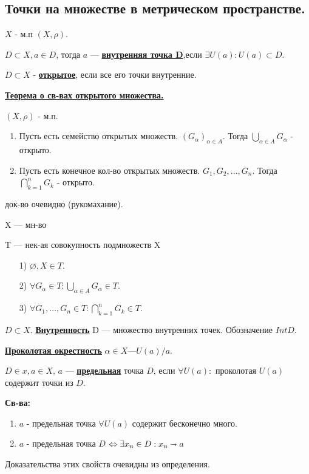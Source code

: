 \documentclass{article}
\newcommand{\deff}[1]{\underline{\textbf{#1}}}
\newcommand{\thmm}[1]{\underline{\textbf{#1}}}
\begin{document}
\subsection{Точки на множестве в метрическом пространстве.}

$X$ - м.п $(X,\rho)$.

$D \subset X, a \in D$, тогда $a$ --- \deff{внутренняя точка D},если $\exists U(a): U(a) \subset D$. 

$D \subset X $ - \deff{открытое}, если все его точки внутренние.

\thmm{Теорема о св-вах открытого множества.}

$(X,\rho)$ - м.п.

\begin{enumerate}
    \item Пусть есть семейство открытых множеств. $(G_\alpha)_{\alpha \in A}$. Тогда $\bigcup\limits_{\alpha \in A}G_\alpha$ - открыто.
    \item Пусть есть конечное кол-во открытых множеств. $G_1,G_2,\ldots, G_n$. Тогда $\bigcap\limits_{k=1}^nG_k$ - открыто.
    
\end{enumerate}

док-во очевидно (рукомахание).

X --- мн-во

T --- нек-ая совокупность подмножеств X

\begin{enumerate}
    \item[1) ] $\varnothing, X \in T$.
    \item[2) ] $\forall G_{\alpha} \in T: \bigcup\limits_{\alpha \in A}G_\alpha \in T$.
    \item[3) ] $\forall G_1,\ldots,G_n \in T: \bigcap\limits_{k=1}^n G_k \in T$.
\end{enumerate}

 $D \subset X$. \deff{Внутренность} D --- множество внутренних точек. Обозначение $Int D$.

\deff{ Проколотая окрестность} $\alpha \in X $---$U(a)/{a}$. 

\textbf{$D \in x, a \in X$}, $a$ --- \deff{предельная} точка $D$, если $\forall U(a): $ проколотая $U(a)$ содержит точки из $D$.

\textbf{Св-ва:}
\begin{enumerate}
    \item $a$ - предельная точка $\forall U(a)$ содержит бесконечно много.
    \item $a$ - предельная точка $D$ $\Leftrightarrow \exists x_n \in D: x_n \shortrightarrow a$ 
\end{enumerate}
Доказательства этих свойств очевидны из определения.
\end{document}
